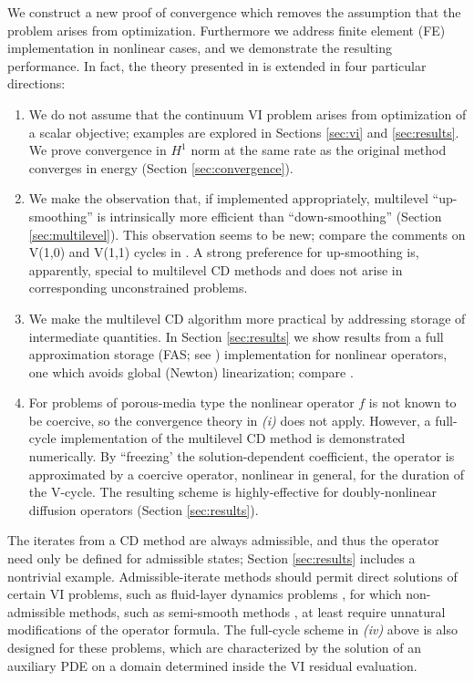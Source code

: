 \documentclass[letterpaper,final,12pt,reqno]{amsart}
\theoremstyle{cstyle}
\theoremstyle{cstyle*}
\theoremstyle{dstyle}
\numberwithin{equation}{section}
\numberwithin{figure}{section}
\numberwithin{table}{section}
\numberwithin{theorem}{section}
\begin{document}
We construct a new proof of convergence which removes the assumption that the problem arises from optimization.  Furthermore we address finite element (FE) implementation in nonlinear cases, and we demonstrate the resulting performance.  In fact, the theory presented in \cite{Tai2003} is extended in four particular directions:
\renewcommand{\labelenumi}{\emph{(\roman{enumi})}}
\begin{enumerate}
\item We do not assume that the continuum VI problem arises from optimization of a scalar objective; examples are explored in Sections \ref{sec:vi} and \ref{sec:results}.  We prove convergence in $H^1$ norm at the same rate as the original method converges in energy (Section \ref{sec:convergence}). %

\item We make the observation that, if implemented appropriately, multilevel ``up-smoothing'' is intrinsically more efficient than ``down-smoothing'' (Section \ref{sec:multilevel}).  This observation seems to be new; compare the comments on V(1,0) and V(1,1) cycles in \cite{GraeserKornhuber2009,Tai2003}.  A strong preference for up-smoothing is, apparently, special to multilevel CD methods and does not arise in corresponding unconstrained problems.

\item We make the multilevel CD algorithm more practical by addressing storage of intermediate quantities.  In Section \ref{sec:results} we show results from a full approximation storage (FAS; see \cite{Brandt1977}) implementation for nonlinear operators, one which avoids global (Newton) linearization; compare \cite{GraeserKornhuber2009}.

\item For problems of porous-media type the nonlinear operator $f$ is not known to be coercive, so the convergence theory in \emph{(i)} does not apply.  However, a full-cycle implementation of the multilevel CD method is demonstrated numerically.  By ``freezing' the solution-dependent coefficient, the operator is approximated by a coercive operator, nonlinear in general, for the duration of the V-cycle.  The resulting scheme is highly-effective for doubly-nonlinear diffusion operators (Section \ref{sec:results}).
\end{enumerate}

The iterates from a CD method are always admissible, and thus the operator need only be defined for admissible states; Section \ref{sec:results} includes a nontrivial example.  Admissible-iterate methods should permit direct solutions of certain VI problems, such as fluid-layer dynamics problems \cite{Bueler2021conservation,JouvetBueler2012}, for which non-admissible methods, such as semi-smooth methods \cite{BensonMunson2006}, at least require unnatural modifications of the operator formula.  The full-cycle scheme in \emph{(iv)} above is also designed for these problems, which are characterized by the solution of an auxiliary PDE on a domain determined inside the VI residual evaluation.
\end{document}
